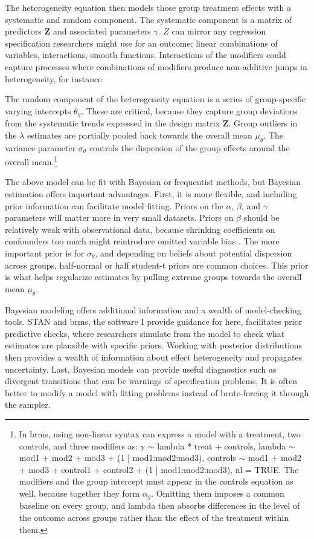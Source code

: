 \documentclass[12pt]{article}
\begin{document}
The heterogeneity equation then models those group treatment effects with a systematic and random component. 
The systematic component is a matrix of predictors \textbf{Z} and associated parameters $\gamma$. 
$Z$ can mirror any regression specification researchers might use for an outcome; linear combinations of variables, interactions, smooth functions. 
Interactions of the modifiers could capture processes where combinations of modifiers produce non-additive jumps in heterogeneity, for instance.


The random component of the heterogeneity equation is a series of group-specific varying intercepts $\theta_g$.
These are critical, because they capture group deviations from the systematic trends expressed in the design matrix \textbf{Z}. 
Group outliers in the $\lambda$ estimates are partially pooled back towards the overall mean $\mu_\theta$.
The variance parameter $\sigma_\theta$ controls the dispersion of the group effects around the overall mean.\footnote{In brms, using non-linear syntax can express a model with a treatment, two controls, and three modifiers as: y $\sim$ lambda * treat + controls, lambda $\sim$ mod1 + mod2 + mod3 + (1 | mod1:mod2:mod3), controls $\sim$ mod1 + mod2 + mod3 + control1 + control2 + (1 | mod1:mod2:mod3), nl = TRUE. The modifiers and the group intercept must appear in the controls equation as well, because together they form $\alpha_g$. Omitting them imposes a common baseline on every group, and lambda then absorbs differences in the level of the outcome across groups rather than the effect of the treatment within them.}


The above model can be fit with Bayesian or frequentist methods, but Bayesian estimation offers important advantages.
First, it is more flexible, and including prior information can facilitate model fitting. 
Priors on the $\alpha$, $\beta$, and $\gamma$ parameters will matter more in very small datasets.
Priors on $\beta$ should be relatively weak with observational data, because shrinking coefficients on confounders too much might reintroduce omitted variable bias \citep{Hahnetal2018}. 
The more important prior is for $\sigma_\theta$, and depending on beliefs about potential dispersion across groups, half-normal or half student-t priors are common choices. 
This prior is what helps regularize estimates by pulling extreme groups towards the overall mean $\mu_\theta$.


Bayesian modeling offers additional information and a wealth of model-checking tools. 
STAN and brms, the software I provide guidance for here, facilitates prior predictive checks, where researchers simulate from the model to check what estimates are plausible with specific priors. 
Working with posterior distributions then provides a wealth of information about effect heterogeneity and propagates uncertainty.  
Last, Bayesian models can provide useful diagnostics such as divergent transitions that can be warnings of specification problems.
It is often better to modify a model with fitting problems instead of brute-forcing it through the sampler. 
\end{document}
